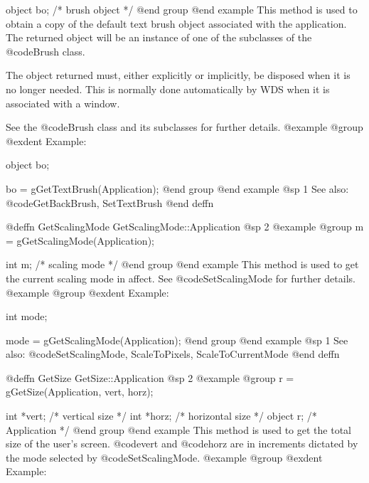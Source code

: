 object  bo;     /*  brush object  */
@end group
@end example
This method is used to obtain a copy of the default text brush object
associated with the application.  The returned object will be an
instance of one of the subclasses of the @code{Brush} class.

The object returned must, either explicitly or implicitly, be
disposed when it is no longer needed.  This is normally done
automatically by WDS when it is associated with a window.

See the @code{Brush} class and its subclasses for further details.
@example
@group
@exdent Example:

object  bo;

bo = gGetTextBrush(Application);
@end group
@end example
@sp 1
See also:  @code{GetBackBrush, SetTextBrush}
@end deffn















@deffn {GetScalingMode} GetScalingMode::Application
@sp 2
@example
@group
m = gGetScalingMode(Application);

int     m;      /*  scaling mode   */
@end group
@end example
This method is used to get the current scaling mode in affect.
See @code{SetScalingMode} for further details.
@example
@group
@exdent Example:

int     mode;

mode = gGetScalingMode(Application);
@end group
@end example
@sp 1
See also:  @code{SetScalingMode, ScaleToPixels, ScaleToCurrentMode}
@end deffn
















@deffn {GetSize} GetSize::Application
@sp 2
@example
@group
r = gGetSize(Application, vert, horz);

int    *vert;   /*  vertical size    */
int    *horz;   /*  horizontal size  */
object  r;      /*  Application      */
@end group
@end example
This method is used to get the total size of the user's screen.
@code{vert} and @code{horz} are in increments dictated by the
mode selected by @code{SetScalingMode}.  
@example
@group
@exdent Example:

